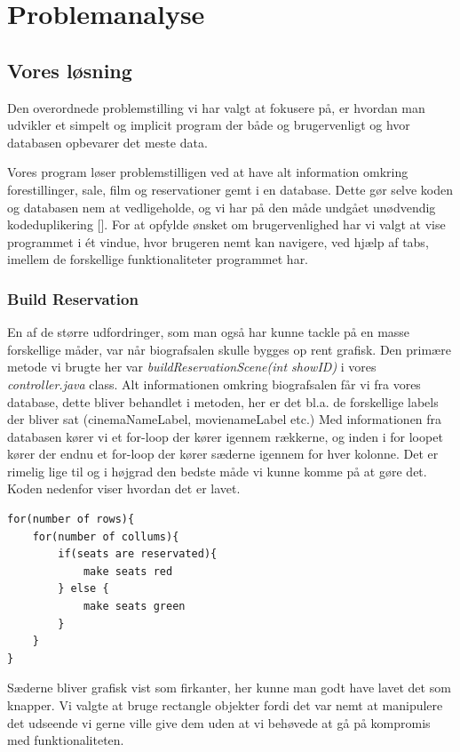 \documentclass[final]{report}
\begin{document}
\chapter{Problemanalyse}

\section{Vores løsning}
Den overordnede problemstilling vi har valgt at fokusere på, er hvordan man udvikler et simpelt og implicit program der både og brugervenligt og hvor databasen opbevarer det meste data. 

Vores program løser problemstilligen ved at have alt information omkring forestillinger, sale, film og reservationer gemt i en database. Dette gør selve koden og databasen nem at vedligeholde, og vi har på den måde undgået unødvendig kodeduplikering [\cite{GRPRO8}]. For at opfylde ønsket om brugervenlighed har vi valgt at vise programmet i ét vindue, hvor brugeren nemt kan navigere, ved hjælp af tabs, imellem de forskellige funktionaliteter programmet har.

\subsection{Build Reservation}
En af de større udfordringer, som man også har kunne tackle på en masse forskellige måder, var når biografsalen skulle bygges op rent grafisk. Den primære metode vi brugte her var \emph{buildReservationScene(int showID)} i vores \emph{controller.java} class. Alt informationen omkring biografsalen får vi fra vores database, dette bliver behandlet i metoden, her er det bl.a. de forskellige labels der bliver sat (cinemaNameLabel, movienameLabel etc.) Med informationen fra databasen kører vi et for-loop der kører igennem rækkerne, og inden i for loopet kører der endnu et for-loop der kører sæderne igennem for hver kolonne. Det er rimelig lige til og i højgrad den bedste måde vi kunne komme på at gøre det. Koden nedenfor viser hvordan det er lavet. 

\begin{verbatim}
for(number of rows){
    for(number of collums){
        if(seats are reservated){
            make seats red
        } else {
            make seats green
        }
    }
}
\end{verbatim}

Sæderne bliver grafisk vist som firkanter, her kunne man godt have lavet det som knapper. Vi valgte at bruge rectangle objekter fordi det var nemt at manipulere det udseende vi gerne ville give dem uden at vi behøvede at gå på kompromis med funktionaliteten.
\end{document}
